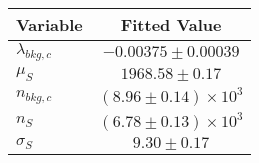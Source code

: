 \begin{tabular}[t]{lc}
\hline
Variable &Fitted Value\\
\hline\hline
$\lambda_{bkg,c}$&$-0.00375\pm0.00039$\\
\hline
$\mu_{S}$&$1968.58\pm0.17$\\
\hline
$n_{bkg,c}$&$(8.96\pm0.14)\times 10^3$\\
\hline
$n_{S}$&$(6.78\pm0.13)\times 10^3$\\
\hline
$\sigma_{S}$&$9.30\pm0.17$\\
\hline
\end{tabular}